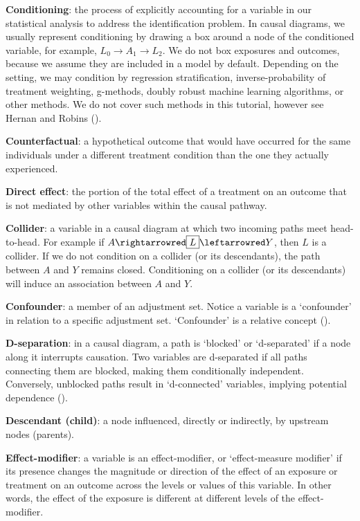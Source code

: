 \documentclass[
  singlecolumn]{article}
\begin{document}
\textbf{Conditioning}: the process of explicitly accounting for a
variable in our statistical analysis to address the identification
problem. In causal diagrams, we usually represent conditioning by
drawing a box around a node of the conditioned variable, for example,
\(\boxed{L_{0}}\to A_{1} \to L_{2}\). We do not box exposures and
outcomes, because we assume they are included in a model by default.
Depending on the setting, we may condition by regression stratification,
inverse-probability of treatment weighting, g-methods, doubly robust
machine learning algorithms, or other methods. We do not cover such
methods in this tutorial, however see Hernan and Robins
().

\textbf{Counterfactual}: a hypothetical outcome that would have occurred
for the same individuals under a different treatment condition than the
one they actually experienced.

\textbf{Direct effect}: the portion of the total effect of a treatment
on an outcome that is not mediated by other variables within the causal
pathway.

\textbf{Collider}: a variable in a causal diagram at which two incoming
paths meet head-to-head. For example if
\(A \rightarrowred \boxed{L} \leftarrowred Y\), then \(L\) is a
collider. If we do not condition on a collider (or its descendants), the
path between \(A\) and \(Y\) remains closed. Conditioning on a collider
(or its descendants) will induce an association between \(A\) and \(Y\).

\textbf{Confounder}: a member of an adjustment set. Notice a variable is
a `confounder' in relation to a specific adjustment set. `Confounder' is
a relative concept ().

\textbf{D-separation}: in a causal diagram, a path is `blocked' or
`d-separated' if a node along it interrupts causation. Two variables are
d-separated if all paths connecting them are blocked, making them
conditionally independent. Conversely, unblocked paths result in
`d-connected' variables, implying potential dependence
().

\textbf{Descendant (child)}: a node influenced, directly or indirectly,
by upstream nodes (parents).

\textbf{Effect-modifier}: a variable is an effect-modifier, or
`effect-measure modifier' if its presence changes the magnitude or
direction of the effect of an exposure or treatment on an outcome across
the levels or values of this variable. In other words, the effect of the
exposure is different at different levels of the effect-modifier.
\end{document}
